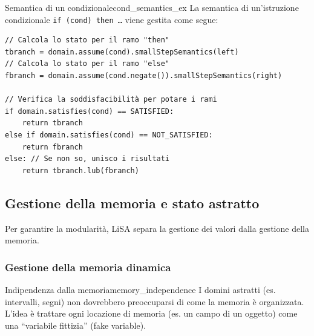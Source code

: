 \begin{esempio}{Semantica di un condizionale}{cond_semantics_ex}
La semantica di un'istruzione condizionale \texttt{if (cond) then \ldots}
viene gestita come segue:
\begin{verbatim}
// Calcola lo stato per il ramo "then"
tbranch = domain.assume(cond).smallStepSemantics(left)
// Calcola lo stato per il ramo "else"
fbranch = domain.assume(cond.negate()).smallStepSemantics(right)

// Verifica la soddisfacibilità per potare i rami
if domain.satisfies(cond) == SATISFIED:
    return tbranch
else if domain.satisfies(cond) == NOT_SATISFIED:
    return fbranch
else: // Se non so, unisco i risultati
    return tbranch.lub(fbranch)
\end{verbatim}

\end{esempio}

\subsection{Gestione della memoria e stato astratto}

Per garantire la modularità, LiSA separa la gestione dei valori dalla
gestione della memoria.

\subsubsection{Gestione della memoria dinamica}

\begin{nota}{Indipendenza dalla memoria}{memory_independence}
I domini astratti (es. intervalli, segni) non dovrebbero preoccuparsi di
come la memoria è organizzata.
L'idea è trattare ogni locazione di memoria (es. un campo di un oggetto)
come una ``variabile fittizia'' (fake variable).
\end{nota}

